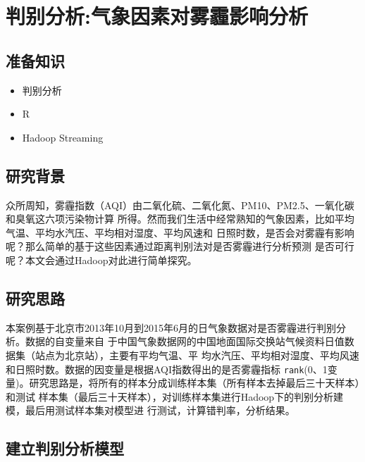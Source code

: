 \section{判别分析:气象因素对雾霾影响分析}\label{ux5b9eux4f8bux5206ux6790ux57faux4e8eux5224ux522bux5206ux6790ux7684ux6c14ux8c61ux56e0ux7d20ux5bf9ux96feux973eux7684ux5f71ux54cd}

\subsection{准备知识}\label{ux51c6ux5907ux77e5ux8bc6}

\begin{itemize}
\itemsep1pt\parskip0pt
\item
  判别分析
\item
  R
\item
  Hadoop Streaming
\end{itemize}

\subsection{研究背景}\label{ux7814ux7a76ux80ccux666f}

众所周知，雾霾指数（AQI）由二氧化硫、二氧化氮、PM10、PM2.5、一氧化碳和臭氧这六项污染物计算
所得。然而我们生活中经常熟知的气象因素，比如平均气温、平均水汽压、平均相对湿度、平均风速和
日照时数，是否会对雾霾有影响呢？那么简单的基于这些因素通过距离判别法对是否雾霾进行分析预测
是否可行呢？本文会通过Hadoop对此进行简单探究。

\subsection{研究思路}\label{ux7814ux7a76ux601dux8def}

本案例基于北京市2013年10月到2015年6月的日气象数据对是否雾霾进行判别分析。数据的自变量来自
于中国气象数据网的中国地面国际交换站气候资料日值数据集（站点为北京站），主要有平均气温、平
均水汽压、平均相对湿度、平均风速和日照时数。数据的因变量是根据AQI指数得出的是否雾霾指标
\lstinline|rank|(0、1变量)。研究思路是，将所有的样本分成训练样本集（所有样本去掉最后三十天样本）和测试
样本集（最后三十天样本），对训练样本集进行Hadoop下的判别分析建模，最后用测试样本集对模型进
行测试，计算错判率，分析结果。

\subsection{建立判别分析模型}\label{ux5efaux7acbux5224ux522bux5206ux6790ux6a21ux578b}


